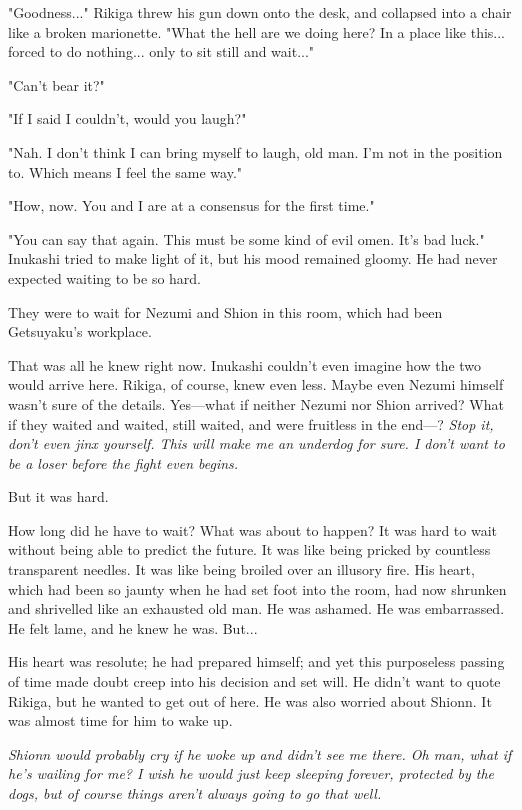 "Goodness..." Rikiga threw his gun down onto the desk, and collapsed
into a chair like a broken marionette. "What the hell are we doing here?
In a place like this... forced to do nothing... only to sit still and
wait..."

"Can't bear it?"

"If I said I couldn't, would you laugh?"

"Nah. I don't think I can bring myself to laugh, old man. I'm not in the
position to. Which means I feel the same way."

"How, now. You and I are at a consensus for the first time."

"You can say that again. This must be some kind of evil omen. It's bad
luck." Inukashi tried to make light of it, but his mood remained gloomy.
He had never expected waiting to be so hard.

They were to wait for Nezumi and Shion in this room, which had been
Getsuyaku's workplace.

That was all he knew right now. Inukashi couldn't even imagine how the
two would arrive here. Rikiga, of course, knew even less. Maybe even
Nezumi himself wasn't sure of the details. Yes---what if neither Nezumi
nor Shion arrived? What if they waited and waited, still waited, and
were fruitless in the end---? \emph{Stop it, don't even jinx yourself. This will
make me an underdog for sure. I don't want to be a loser before the
fight even begins.}

But it was hard.

How long did he have to wait? What was about to happen? It was hard to
wait without being able to predict the future. It was like being pricked
by countless transparent needles. It was like being broiled over an
illusory fire. His heart, which had been so jaunty when he had set foot
into the room, had now shrunken and shrivelled like an exhausted old
man. He was ashamed. He was embarrassed. He felt lame, and he knew he
was. But...

His heart was resolute; he had prepared himself; and yet this
purposeless passing of time made doubt creep into his decision and set
will. He didn't want to quote Rikiga, but he wanted to get out of here.
He was also worried about Shionn. It was almost time for him to wake up.

\emph{Shionn would probably cry if he woke up and didn't see me there. Oh man,
what if he's wailing for me? I wish he would just keep sleeping forever,
protected by the dogs, but of course things aren't always going to go
that well.}

